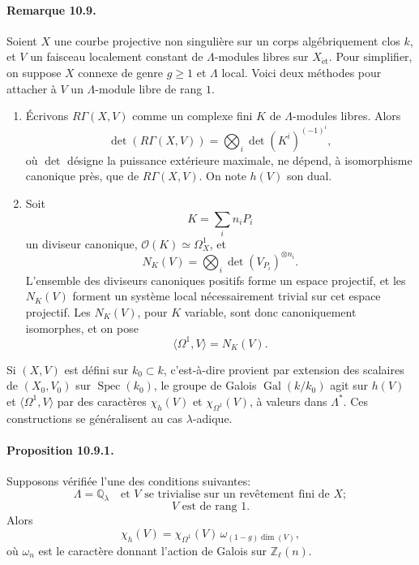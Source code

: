 \documentclass[10pt]{article}
\newcommand{\Q}{\mathbb Q}
\newcommand{\Z}{\mathbb Z}
\newcommand{\Gal}{\operatorname{Gal}}
\newcommand{\Spec}{\operatorname{Spec}}
\providecommand{\Spec}{\operatorname{Spec}}
\providecommand{\Gal}{\operatorname{Gal}}
\providecommand{\Gal}{\operatorname{Gal}}
\providecommand{\Spec}{\operatorname{Spec}}
\providecommand{\Spec}{\operatorname{Spec}}
\providecommand{\Gal}{\operatorname{Gal}}
\providecommand{\Gal}{\operatorname{Gal}}
\begin{document}
\paragraph{Remarque 10.9.} Soient \(X\) une courbe projective non singulière sur un corps algébriquement clos \(k\), et \(V\) un faisceau localement constant de \(\Lambda\)-modules libres sur \(X_{\mathrm{\acute et}}\). Pour simplifier, on suppose \(X\) connexe de genre \(g\ge1\) et \(\Lambda\) local. Voici deux méthodes pour attacher à \(V\) un \(\Lambda\)-module libre de rang \(1\).

\begin{enumerate}[label=(\alph*)]
\item Écrivons \(R\Gamma(X,V)\) comme un complexe fini \(K\) de \(\Lambda\)-modules libres. Alors
\[
\det(R\Gamma(X,V))=
\bigotimes_i \det(K^i)^{(-1)^i},
\]
où \(\det\) désigne la puissance extérieure maximale, ne dépend, à isomorphisme canonique près, que de \(R\Gamma(X,V)\). On note \(h(V)\) son dual.

\item Soit
\[
K=\sum_i n_iP_i
\]
un diviseur canonique, \(\mathcal O(K)\simeq\Omega_X^1\), et
\[
N_K(V)=\bigotimes_i \det(V_{P_i})^{\otimes n_i}.
\]
L'ensemble des diviseurs canoniques positifs forme un espace projectif, et les \(N_K(V)\) forment un système local nécessairement trivial sur cet espace projectif. Les \(N_K(V)\), pour \(K\) variable, sont donc canoniquement isomorphes, et on pose
\[
\langle\Omega^1,V\rangle=N_K(V).
\]
\end{enumerate}

Si \((X,V)\) est défini sur \(k_0\subset k\), c'est-à-dire provient par extension des scalaires de \((X_0,V_0)\) sur \(\Spec(k_0)\), le groupe de Galois \(\Gal(k/k_0)\) agit sur \(h(V)\) et \(\langle\Omega^1,V\rangle\) par des caractères \(\chi_h(V)\) et \(\chi_{\Omega^1}(V)\), à valeurs dans \(\Lambda^*\). Ces constructions se généralisent au cas \(\lambda\)-adique.

\paragraph{Proposition 10.9.1.} Supposons vérifiée l'une des conditions suivantes:
\[
\tag{a}
\Lambda=\Q_\lambda\quad\text{et }V\text{ se trivialise sur un revêtement fini de }X;
\]
\[
\tag{b}
V\text{ est de rang }1.
\]
Alors
\[
\tag{10.9.1}
\chi_h(V)=\chi_{\Omega^1}(V)\,\omega_{(1-g)\dim(V)},
\]
où \(\omega_n\) est le caractère donnant l'action de Galois sur \(\Z_\ell(n)\).
\end{document}

